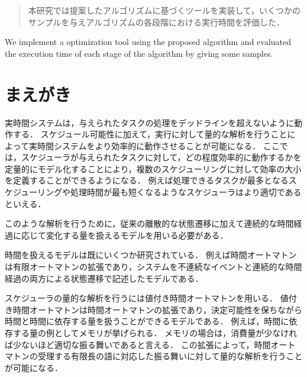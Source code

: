 \documentclass{ieicej}
\begin{document}
\begin{abstract}
本研究では提案したアルゴリズムに基づくツールを実装して，いくつかのサンプルを与えアルゴリズムの各段階における実行時間を評価した．
\end{abstract}
\begin{keyword}
\end{keyword}
\begin{eabstract}
We implement a optimization tool using the proposed algorithm and evaluated the execution time of each stage of the algorithm by giving some samples.
\end{eabstract}
\begin{ekeyword}
\end{ekeyword}
\maketitle

\section{まえがき}
実時間システムは，与えられたタスクの処理をデッドラインを超えないように動作する．
スケジュール可能性に加えて，実行に対して量的な解析を行うことによって実時間システムをより効率的に動作させることが可能になる．
ここでは，スケジューラが与えられたタスクに対して，どの程度効率的に動作するかを定量的にモデル化することにより，複数のスケジューリングに対して効率の大小を定義することができるようになる．
例えば処理できるタスクが最多となるスケジューリングや処理時間が最も短くなるようなスケジューラはより適切であるといえる．

このような解析を行うために，従来の離散的な状態遷移に加えて連続的な時間経過に応じて変化する量を扱えるモデルを用いる必要がある．

時間を扱えるモデルは既にいくつか研究されている．
例えば時間オートマトン\cite{ta}は有限オートマトンの拡張であり，システムを不連続なイベントと連続的な時間経過の両方による状態遷移で記述したモデルである．

スケジューラの量的な解析を行うには値付き時間オートマトン\cite{pta}を用いる．
値付き時間オートマトンは時間オートマトンの拡張であり，決定可能性を保ちながら時間と時間に依存する量を扱うことができるモデルである．
例えば，時間に依存する量の例としてメモリが挙げられる．
メモリの場合は，消費量が少なければ少ないほど適切な振る舞いであると言える．
この拡張によって，時間オートマトンの受理する有限長の語に対応した振る舞いに対して量的な解析を行うことが可能になる．
\end{document}
